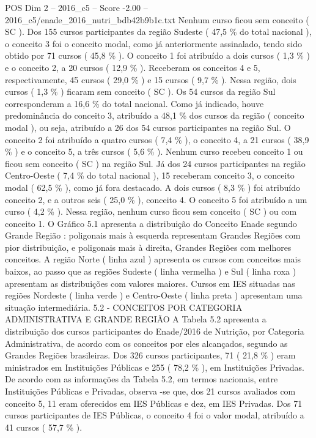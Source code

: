 \begin{textsample}{POS Dim 2 – 2016\_c5 – Score -2.00 – 2016\_c5/enade\_2016\_nutri\_bdb42b9b1c.txt}
Nenhum curso ficou sem conceito ( SC ).
Dos 155 cursos participantes da região Sudeste ( 47,5 \% do total nacional ), o conceito 3 foi o conceito modal, como já anteriormente assinalado, tendo sido obtido por 71 cursos ( 45,8 \% ).
O conceito 1 foi atribuído a dois cursos ( 1,3 \% ) e o conceito 2, a 20 cursos ( 12,9 \% ).
Receberam os conceitos 4 e 5, respectivamente, 45 cursos ( 29,0 \% ) e 15 cursos ( 9,7 \% ).
Nessa região, dois cursos ( 1,3 \% ) ficaram sem conceito ( SC ).
Os 54 cursos da região Sul corresponderam a 16,6 \% do total nacional.
Como já indicado, houve predominância do conceito 3, atribuído a 48,1 \% dos cursos da região ( conceito modal ), ou seja, atribuído a 26 dos 54 cursos participantes na região Sul.
O conceito 2 foi atribuído a quatro cursos ( 7,4 \% ), o conceito 4, a 21 cursos ( 38,9 \% ) e o conceito 5, a três cursos ( 5,6 \% ).
Nenhum curso recebeu conceito 1 ou ficou sem conceito ( SC ) na região Sul.
Já dos 24 cursos participantes na região Centro-Oeste ( 7,4 \% do total nacional ), 15 receberam conceito 3, o conceito modal ( 62,5 \% ), como já fora destacado.
A dois cursos ( 8,3 \% ) foi atribuído conceito 2, e a outros seis ( 25,0 \% ), conceito 4.
O conceito 5 foi atribuído a um curso ( 4,2 \% ).
Nessa região, nenhum curso ficou sem conceito ( SC ) ou com conceito 1.
O Gráfico 5.1 apresenta a distribuição do Conceito Enade segundo Grande Região : poligonais mais à esquerda representam Grandes Regiões com pior distribuição, e poligonais mais à direita, Grandes Regiões com melhores conceitos.
A região Norte ( linha azul ) apresenta os cursos com conceitos mais baixos, ao passo que as regiões Sudeste ( linha vermelha ) e Sul ( linha roxa ) apresentam as distribuições com valores maiores.
Cursos em IES situadas nas regiões Nordeste ( linha verde ) e Centro-Oeste ( linha preta ) apresentam uma situação intermediária. 5.2 - CONCEITOS POR CATEGORIA ADMINISTRATIVA E GRANDE REGIÃO A Tabela 5.2 apresenta a distribuição dos cursos participantes do Enade/2016 de Nutrição, por Categoria Administrativa, de acordo com os conceitos por eles alcançados, segundo as Grandes Regiões brasileiras.
Dos 326 cursos participantes, 71 ( 21,8 \% ) eram ministrados em Instituições Públicas e 255 ( 78,2 \% ), em Instituições Privadas.
De acordo com as informações da Tabela 5.2, em termos nacionais, entre Instituições Públicas e Privadas, observa -se que, dos 21 cursos avaliados com conceito 5, 11 eram oferecidos em IES Públicas e dez, em IES Privadas.
Dos 71 cursos participantes de IES Públicas, o conceito 4 foi o valor modal, atribuído a 41 cursos ( 57,7 \% ).

\end{textsample}
